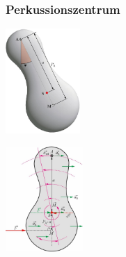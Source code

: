 \subsubsection{Perkussionszentrum}
\begin{center}
	\begin{minipage}{0.3\textwidth}
		\includegraphics[height=4cm,keepaspectratio=true]{Images/schwerependel_perkussionszentrum.png}
	\end{minipage}%
	\begin{minipage}{0.3\textwidth}
		\includegraphics[height=4cm,keepaspectratio=true]{Images/perkussionszentrum.png}
	\end{minipage}
\end{center}





